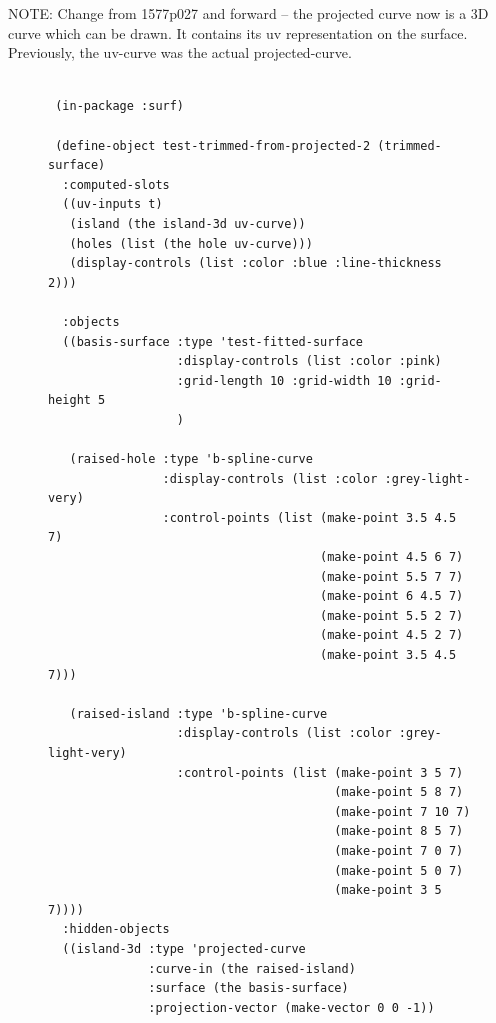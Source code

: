 \documentclass [11pt]{book}
\begin{document}
\begin{itemize}
\begin{description}
NOTE: Change from 1577p027 and forward -- the projected curve now is a 3D curve which 
can be drawn. It contains its uv representation on the surface. Previously, the uv-curve
was the actual projected-curve.





\end{description}




\begin{figure}
\begin{lrbox}{\boxedverb}
\begin{minipage}{\linewidth}
{\small

\begin{verbatim}

 (in-package :surf)

 (define-object test-trimmed-from-projected-2 (trimmed-surface)
  :computed-slots
  ((uv-inputs t)
   (island (the island-3d uv-curve))
   (holes (list (the hole uv-curve)))
   (display-controls (list :color :blue :line-thickness 2)))
  
  :objects
  ((basis-surface :type 'test-fitted-surface
                  :display-controls (list :color :pink)
                  :grid-length 10 :grid-width 10 :grid-height 5
                  )
   
   (raised-hole :type 'b-spline-curve
                :display-controls (list :color :grey-light-very)
                :control-points (list (make-point 3.5 4.5 7)
                                      (make-point 4.5 6 7) 
                                      (make-point 5.5 7 7) 
                                      (make-point 6 4.5 7) 
                                      (make-point 5.5 2 7) 
                                      (make-point 4.5 2 7) 
                                      (make-point 3.5 4.5 7)))

   (raised-island :type 'b-spline-curve
                  :display-controls (list :color :grey-light-very)
                  :control-points (list (make-point 3 5 7)
                                        (make-point 5 8 7) 
                                        (make-point 7 10 7) 
                                        (make-point 8 5 7) 
                                        (make-point 7 0 7) 
                                        (make-point 5 0 7) 
                                        (make-point 3 5 7))))
  :hidden-objects
  ((island-3d :type 'projected-curve
              :curve-in (the raised-island)
              :surface (the basis-surface)
              :projection-vector (make-vector 0 0 -1))
   


\end{verbatim}}
\end{minipage}
\end{lrbox}
\end{figure}
\end{itemize}
\end{document}
